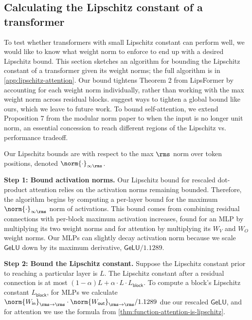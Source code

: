 \subsection{Calculating the Lipschitz constant of a transformer}
\label{subsec:lipschitz-constant-of-transformer}

To test whether transformers with small Lipschitz constant can perform well, we would like to know what weight norm to enforce to end up with a desired Lipschitz bound. This section sketches an algorithm for bounding the Lipschitz constant of a transformer given its weight norms; the full algorithm is in \cref{app:lipschitz-attention}. Our bound tightens Theorem 2 from LipsFormer \citep{qi2023lipsformer} by accounting for each weight norm individually, rather than working with the max weight norm across residual blocks. \citet{fazlyab2023efficientaccurateestimationlipschitz} suggest ways to tighten a global bound like ours, which we leave to future work. To bound self-attention, we extend Proposition 7 from the modular norm paper \citep{large2024} to when the input is no longer unit norm, an essential concession to reach different regions of the Lipschitz vs. performance tradeoff.

Our Lipschitz bounds are with respect to the max $\rms$ norm over token positions, denoted $\norm{\cdot}_{\infty\rms}$.

\textbf{Step 1: Bound activation norms.} Our Lipschitz bound for rescaled dot-product attention relies on the activation norms remaining bounded. Therefore, the algorithm begins by computing a per-layer bound for the maximum $\norm{\cdot}_{\infty\rms}$ norm of activations. This bound comes from combining residual connections with per-block maximum activation increases, found for an MLP by multiplying its two weight norms and for attention by multiplying its $W_V$ and $W_O$ weight norms. Our MLPs can slightly decay activation norm because we scale $\mathsf{GeLU}$ down by its maximum derivative, $\mathsf{GeLU}/1.1289$.

\textbf{Step 2: Bound the Lipschitz constant.} Suppose the Lipschitz constant prior to reaching a particular layer is $L$. The Lipschitz constant after a residual connection is at most $(1 - \alpha) L + \alpha \cdot L \cdot L_\mathsf{block}$. To compute a block's Lipschitz constant $L_\mathsf{block}$, for MLPs we calculate $\norm{W_\mathsf{in}}_{\rms\to\rms} \cdot \norm{W_\mathsf{out}}_{\rms\to\rms} / 1.1289$ due our rescaled $\mathsf{GeLU}$, and for attention we use the formula from \cref{thm:function-attention-is-lipschitz}.

